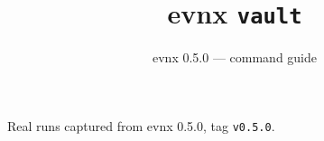 \documentclass[aspectratio=169,10pt]{beamer}
\title{evnx \texttt{vault}}
\subtitle{evnx 0.5.0 — command guide}
\date{}
\begin{document}
\begin{frame}[plain]\titlepage
  \begin{center}\footnotesize
  \textcolor{evnxMuted}{Real runs captured from evnx 0.5.0, tag \texttt{v0.5.0}.}
  \end{center}
\end{frame}

\end{document}
